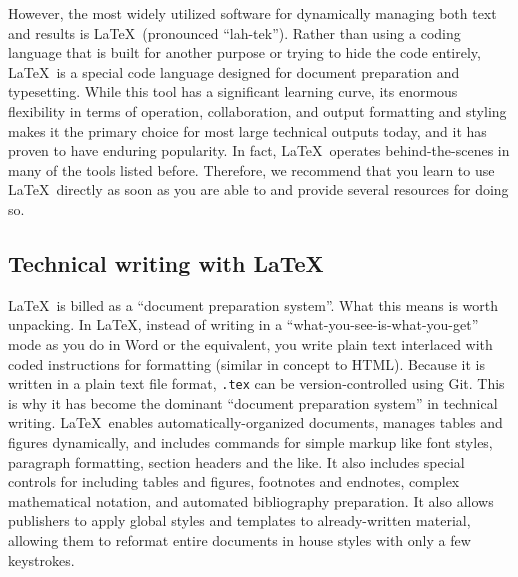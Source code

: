 However, the most widely utilized software
for dynamically managing both text and results is \LaTeX\ (pronounced ``lah-tek'').
  \index{\LaTeX}
Rather than using a coding language that is built for another purpose
or trying to hide the code entirely,
\LaTeX\ is a special code language designed for document preparation and typesetting.
While this tool has a significant learning curve,
its enormous flexibility in terms of operation, collaboration,
and output formatting and styling
makes it the primary choice for most large technical outputs today,
and it has proven to have enduring popularity.
In fact, \LaTeX\ operates behind-the-scenes in many of the tools listed before.
Therefore, we recommend that you learn to use \LaTeX\ directly
as soon as you are able to and provide several resources for doing so.

\subsection{Technical writing with \LaTeX}

\LaTeX\ is billed as a ``document preparation system''.
What this means is worth unpacking.
In {\LaTeX}, instead of writing in a ``what-you-see-is-what-you-get'' mode
as you do in Word or the equivalent,
you write plain text interlaced with coded instructions for formatting
(similar in concept to HTML).
Because it is written in a plain text file format,
\texttt{.tex} can be version-controlled using Git.
This is why it has become the dominant ``document preparation system'' in technical writing.
\LaTeX\ enables automatically-organized documents,
manages tables and figures dynamically,
and includes commands for simple markup
like font styles, paragraph formatting, section headers and the like.
It also includes special controls for including tables and figures,
footnotes and endnotes, complex mathematical notation, and automated bibliography preparation.
It also allows publishers to apply global styles and templates to already-written material,
allowing them to reformat entire documents in house styles with only a few keystrokes.


